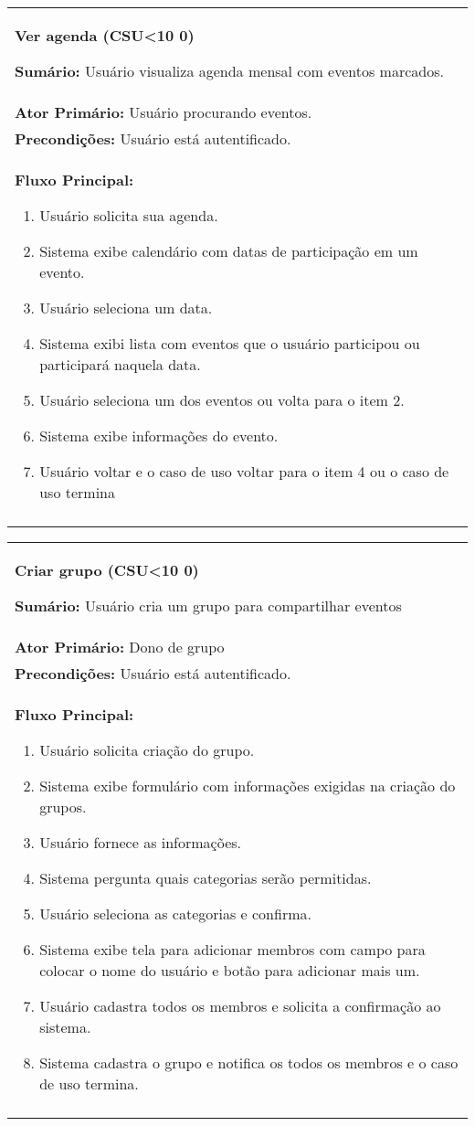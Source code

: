 \documentclass{article}
\newcounter{cscounter}
\newcommand{\sumario}[1] {\textbf{Sumário:} #1\\ }
\newcommand{\ator}[1] {\textbf{Ator Primário:} #1\\}
\newcommand{\precond}[1] {\textbf{Precondições:} #1\\}
\newcommand{\fluxo}{\textbf{Fluxo Principal:}}
\newenvironment{casosdeuso}[1]
{
 \stepcounter{cscounter}
 \begin{center}
 \begin{tabular}{|p{\textwidth}|}
 \hline
 \begin{center}
 \large \textbf{#1 (CSU\ifnum\value{cscounter}<10 0\fi\arabic{cscounter})}
 \end{center}
}
{ 
 \\\\\hline
 \end{tabular} 
 \end{center}
}
\begin{document}
\begin{casosdeuso}{Ver agenda}
 \sumario{Usuário visualiza agenda mensal com eventos marcados.}
 \ator{Usuário procurando eventos.}
 \precond{Usuário está autentificado.}
 \fluxo
\begin{enumerate}[itemsep=0mm]
 \item Usuário solicita sua agenda.
 \item Sistema exibe calendário com datas de participação em um evento.
 \item Usuário seleciona um data.
 \item Sistema exibi lista com eventos que o usuário participou ou participará naquela data.
 \item Usuário seleciona um dos eventos ou volta para o item 2.
 \item Sistema exibe informações do evento.
 \item Usuário voltar e o caso de uso voltar para o item 4 ou o caso de uso termina
\end{enumerate}
\end{casosdeuso}

\begin{casosdeuso}{Criar grupo}
 \sumario{Usuário cria um grupo para compartilhar eventos}
 \ator{Dono de grupo}
 \precond{Usuário está autentificado.}
\fluxo
\begin{enumerate}[itemsep=0mm]
 \item Usuário solicita criação do grupo.
 \item Sistema exibe formulário com informações exigidas na criação do grupos.
 \item Usuário fornece as informações.
 \item Sistema pergunta quais categorias serão permitidas.
 \item Usuário seleciona as categorias e confirma.
 \item Sistema exibe tela para adicionar membros com campo para colocar o nome do usuário e botão para adicionar mais um.
 \item Usuário cadastra todos os membros e solicita a confirmação ao sistema.
 \item Sistema cadastra o grupo e notifica os todos os membros e o caso de uso termina.
\end{enumerate}
\end{casosdeuso}
\end{document}
